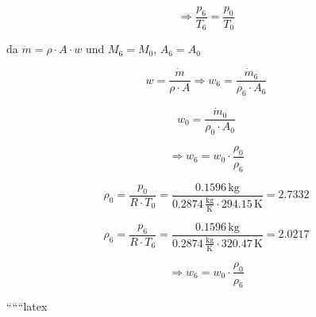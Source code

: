 \begin{equation}
\Rightarrow \frac{p_6}{T_6} = \frac{p_0}{T_0}
\end{equation}

da \(\dot{m} = \rho \cdot A \cdot w\) und \(M_6 = M_0\), \(A_6 = A_0\)

\begin{equation}
w = \frac{\dot{m}}{\rho \cdot A} \Rightarrow w_6 = \frac{\dot{m}_6}{\rho_6 \cdot A_6}
\end{equation}

\begin{equation}
w_0 = \frac{\dot{m}_0}{\rho_0 \cdot A_0}
\end{equation}

\begin{equation}
\Rightarrow w_6 = w_0 \cdot \frac{\rho_0}{\rho_6}
\end{equation}

\begin{equation}
\rho_0 = \frac{p_0}{R \cdot T_0} = \frac{0.1596 \, \text{kg}}{0.2874 \, \frac{\text{kg}}{\text{K}} \cdot 294.15 \, \text{K}} = 2.7332
\end{equation}

\begin{equation}
\rho_6 = \frac{p_6}{R \cdot T_6} = \frac{0.1596 \, \text{kg}}{0.2874 \, \frac{\text{kg}}{\text{K}} \cdot 320.47 \, \text{K}} = 2.0217
\end{equation}

\begin{equation}
\Rightarrow w_6 = w_0 \cdot \frac{\rho_0}{\rho_6}
\end{equation}

``````latex